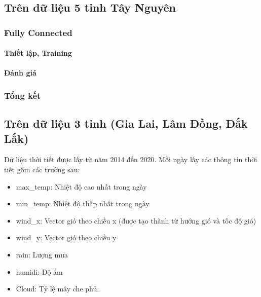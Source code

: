 \documentclass{article}
\begin{document}

\subsection{Trên dữ liệu 5 tỉnh Tây Nguyên}
\subsubsection{Fully Connected}
\paragraph{Thiết lập, Training}

\paragraph{Đánh giá}

\subsubsection{Tổng kết}

\subsection{Trên dữ liệu 3 tỉnh (Gia Lai, Lâm Đồng, Đắk Lắk)}

Dữ liệu thời tiết được lấy từ năm 2014 đến 2020. Mỗi ngày lấy các thông tin thời tiết gồm các trường sau:

\begin{itemize}
	\item max\_temp: Nhiệt độ cao nhất trong ngày
	\item min\_temp: Nhiệt độ thấp nhất trong ngày
	\item wind\_x: Vector gió theo chiều x (được tạo thành từ hướng gió và tốc độ gió)
	\item wind\_y: Vector gió theo chiều y
	\item rain: Lượng mưa
	\item humidi: Độ ẩm
	\item Cloud: Tỷ lệ mây che phủ.
\end{itemize}
\end{document}
